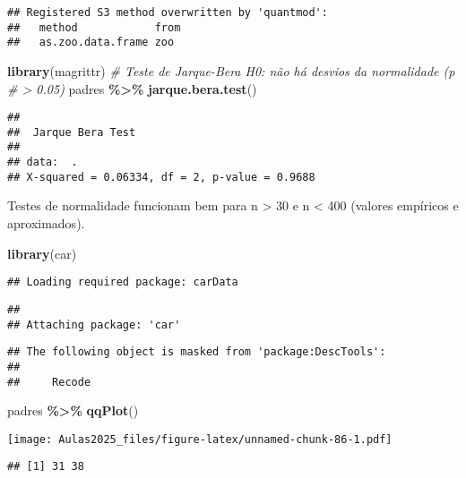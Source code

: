 \documentclass[
]{book}
\newenvironment{Shaded}{\begin{snugshade}}{\end{snugshade}}
\newcommand{\CommentTok}[1]{\textcolor[rgb]{0.56,0.35,0.01}{\textit{#1}}}
\newcommand{\FunctionTok}[1]{\textcolor[rgb]{0.13,0.29,0.53}{\textbf{#1}}}
\newcommand{\NormalTok}[1]{#1}
\newcommand{\SpecialCharTok}[1]{\textcolor[rgb]{0.81,0.36,0.00}{\textbf{#1}}}
\begin{document}
\begin{verbatim}
## Registered S3 method overwritten by 'quantmod':
##   method            from
##   as.zoo.data.frame zoo
\end{verbatim}

\begin{Shaded}
\begin{Highlighting}[]
\FunctionTok{library}\NormalTok{(magrittr)}
\CommentTok{\# Teste de Jarque{-}Bera H0: não há desvios da normalidade (p}
\CommentTok{\# \textgreater{} 0.05)}
\NormalTok{padres }\SpecialCharTok{\%\textgreater{}\%}
    \FunctionTok{jarque.bera.test}\NormalTok{()}
\end{Highlighting}
\end{Shaded}

\begin{verbatim}
## 
##  Jarque Bera Test
## 
## data:  .
## X-squared = 0.06334, df = 2, p-value = 0.9688
\end{verbatim}

Testes de normalidade funcionam bem para n \textgreater{} 30 e n
\textless{} 400 (valores empíricos e aproximados).

\begin{Shaded}
\begin{Highlighting}[]
\FunctionTok{library}\NormalTok{(car)}
\end{Highlighting}
\end{Shaded}

\begin{verbatim}
## Loading required package: carData
\end{verbatim}

\begin{verbatim}
## 
## Attaching package: 'car'
\end{verbatim}

\begin{verbatim}
## The following object is masked from 'package:DescTools':
## 
##     Recode
\end{verbatim}

\begin{Shaded}
\begin{Highlighting}[]
\NormalTok{padres }\SpecialCharTok{\%\textgreater{}\%}
    \FunctionTok{qqPlot}\NormalTok{()}
\end{Highlighting}
\end{Shaded}

\texttt{[image: Aulas2025\_files/figure-latex/unnamed-chunk-86-1.pdf]}

\begin{verbatim}
## [1] 31 38
\end{verbatim}
\end{document}
